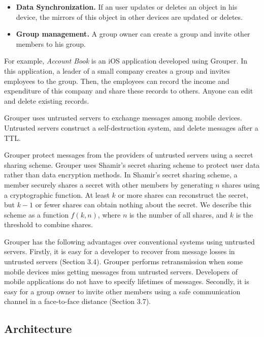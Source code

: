 \documentclass[twocolumn,10pt]{article}
\begin{document}
\begin{itemize}
	\setlength{\itemsep}{1pt}
	\setlength{\parskip}{0pt}
	\setlength{\parsep}{0pt}
	\item \textbf{Data Synchronization.} 
	If an user updates or deletes an object in his device, the mirrors of this object in other devices are updated or deletes.
	\item \textbf{Group management.} 
	A group owner can create a group and invite other members to his group.
\end{itemize}

For example, \emph{Account Book} is an iOS application developed using Grouper. 
In this application, a leader of a small company creates a group and invites employees to the group. 
Then, the employees can record the income and expenditure of this company and share these records to others.
Anyone can edit and delete existing records.

Grouper uses untrusted servers to exchange messages among mobile devices.
Untrusted servers construct a self-destruction system, and delete messages after a TTL.

Grouper protect messages from the providers of untrusted servers using a secret sharing scheme.
Grouper uses Shamir's secret sharing scheme to protect user data rather than data encryption methods.
In  Shamir's secret sharing scheme, a member securely shares a secret with other members by generating $n$ shares using a cryptographic function\cite{smith2013layered}. 
At least $k$ or more shares can reconstruct the secret, but $k-1$ or fewer shares can obtain nothing about the secret\cite{pang2005new}. 
We describe this scheme as a function ${f(k, n)}$, where $n$ is the number of all shares, and $k$ is the threshold to combine shares. 

Grouper has the following advantages over conventional systems using untrusted servers.
Firstly, it is easy for a developer to recover from message losses in untrusted servers (Section 3.4).
Grouper performs retransmission when some mobile devices miss getting messages from untrusted servers.
Developers of mobile applications do not have to specify lifetimes of messages.
Secondly, it is easy for a group owner to invite other members using a safe communication channel in a face-to-face distance (Section 3.7).

\subsection{Architecture}
\end{document}
